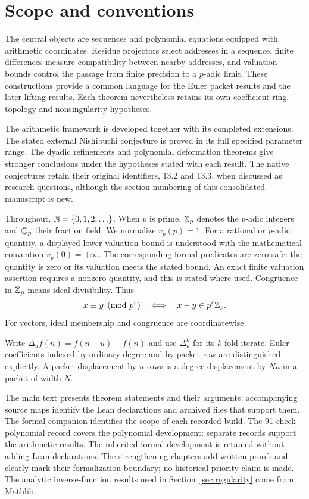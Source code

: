 \section{Scope and conventions}
\label{sec:scope}
The central objects are sequences and polynomial equations equipped with
arithmetic coordinates. Residue projectors select addresses in a sequence,
finite differences measure compatibility between nearby addresses, and
valuation bounds control the passage from finite precision to a $p$-adic
limit. These constructions provide a common language for the Euler packet
results and the later lifting results. Each theorem nevertheless retains its
own coefficient ring, topology and nonsingularity hypotheses.

The arithmetic framework is developed together with its completed
extensions. The stated external Nishibuchi conjecture is proved in its full
specified parameter range. The dyadic refinements and polynomial deformation theorems give stronger
conclusions under the hypotheses stated with each result. The native conjectures retain their original
identifiers, 13.2 and 13.3, when discussed as research questions, although the
section numbering of this consolidated manuscript is new.

Throughout, $\mathbb N=\{0,1,2,\ldots\}$. When $p$ is prime, $\mathbb Z_p$ denotes the
$p$-adic integers and $\mathbb Q_p$ their fraction field. We normalize $v_p(p)=1$.
For a rational or $p$-adic quantity, a displayed lower valuation bound is
understood with the mathematical convention $v_p(0)=+\infty$.
The corresponding formal predicates are zero-safe: the quantity is zero or
its valuation meets the stated bound. An exact finite valuation assertion
requires a nonzero quantity, and this is stated where used. Congruence in
$\mathbb Z_p$ means ideal divisibility. Thus
\[
 x\equiv y\pmod{p^r}\quad\Longleftrightarrow\quad
 x-y\in p^r\mathbb Z_p.
\]
For vectors, ideal membership and congruence are coordinatewise.

Write $\Delta_u f(n)=f(n+u)-f(n)$ and use $\Delta_u^k$ for its $k$-fold
iterate. Euler coefficients indexed by ordinary degree and by packet row are
distinguished explicitly. A packet displacement by $u$ rows is a degree
displacement by $Nu$ in a packet of width $N$.

The main text presents theorem statements and their arguments; accompanying
source maps identify the Lean declarations and archived files that support
them. The formal companion identifies the scope of each recorded build. The
91-check polynomial record covers the polynomial development; separate
records support the arithmetic results.
The inherited formal development is retained without adding Lean declarations. The strengthening chapters add written proofs and clearly mark their formalization boundary; no historical-priority claim is made. The analytic inverse-function results
used in Section~\ref{sec:regularity} come from Mathlib.
